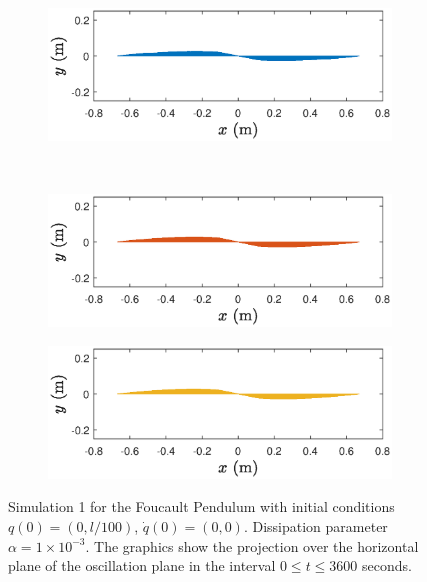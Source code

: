 \documentclass{aims}
\numberwithin{equation}{section}
\theoremstyle{definition}
\begin{document}
\begin{figure}
  \centering
  \begin{subfigure}[b]{0.65\textwidth}
    \centering
    \includegraphics[width=\textwidth]{fig/contacto-alpha0001.eps}
  \end{subfigure} \\
  \begin{subfigure}[b]{0.65\textwidth}
    \centering
    \includegraphics[width=\textwidth]{fig/ld-alpha0001.eps}
  \end{subfigure}
  \begin{subfigure}[b]{0.65\textwidth}
    \centering
    \includegraphics[width=\textwidth]{fig/ref-alpha0001.eps}
  \end{subfigure}
  \caption{Simulation 1 for the Foucault Pendulum with initial conditions $q(0) = (0,l/100)$, $\dot{q}(0) = (0,0)$. Dissipation parameter $\alpha = 1\times 10^{-3}$. The graphics show the projection over the horizontal plane of the oscillation plane in the interval $0\leq t\leq 3600$ seconds.}
  \label{fig:foucault_sim_1_oscillation_plane}
\end{figure}
\end{document}
